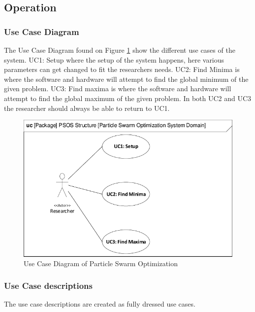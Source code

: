 \subsection{Operation}\label{requirementspecification:operation}

\subsubsection{Use Case Diagram} \label{requirementspecification:usecasediagrams}
The Use Case Diagram found on Figure \ref{fig:ucdiagram} show the different use cases of the system. UC1: Setup where the setup of the system happens, here various parameters can get changed to fit the researchers needs. UC2: Find Minima is where the software and hardware will attempt to find the global minimum of the given problem. UC3: Find maxima is where the software and hardware will attempt to find the global maximum of the given problem. In both UC2 and UC3 the researcher should always be able to return to UC1.

\begin{figure}[H]
	\centering
	\includegraphics[width=0.7\linewidth]{diagram/uc_particle_swarm_optimization_system.pdf}
	\caption{Use Case Diagram of Particle Swarm Optimization}
	\label{fig:ucdiagram}
\end{figure}

\clearpage

\subsubsection{Use Case descriptions} \label{requirementspecification:usecasedescriptions}
The use case descriptions are created as fully dressed use cases. 






